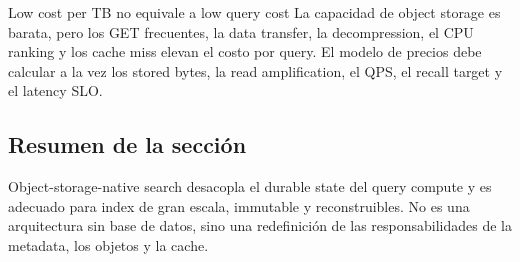\begin{warningbox}{Low cost per TB no equivale a low query cost}
La capacidad de object storage es barata, pero los GET frecuentes, la data transfer, la decompression, el CPU ranking y los cache miss elevan el costo por query. El modelo de precios debe calcular a la vez los stored bytes, la read amplification, el QPS, el recall target y el latency SLO.
\end{warningbox}

\subsection{Resumen de la sección}

Object-storage-native search desacopla el durable state del query compute y es adecuado para index de gran escala, immutable y reconstruibles. No es una arquitectura sin base de datos, sino una redefinición de las responsabilidades de la metadata, los objetos y la cache.
